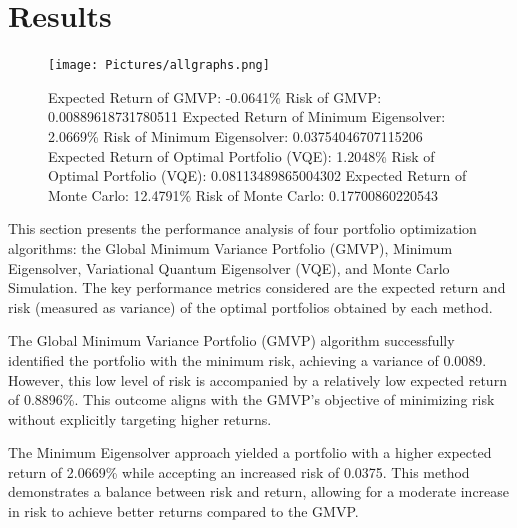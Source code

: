 \documentclass[%
 reprint,
 amsmath,amssymb,
 aps,
]{revtex4-2}
\begin{document}
\section{Results}

\begin{figure}[b]
\texttt{[image: Pictures/allgraphs.png]}
\caption{\label{fig:montecarlo} Expected Return of GMVP: -0.0641\%
Risk of GMVP: 0.00889618731780511 Expected Return of Minimum Eigensolver: 2.0669\% Risk of Minimum Eigensolver: 0.03754046707115206 Expected Return of Optimal Portfolio (VQE): 1.2048\% Risk of Optimal Portfolio (VQE): 0.08113489865004302 Expected Return of Monte Carlo: 12.4791\% Risk of Monte Carlo: 0.17700860220543}
\end{figure}


This section presents the performance analysis of four portfolio optimization algorithms: the Global Minimum Variance Portfolio (GMVP), Minimum Eigensolver, Variational Quantum Eigensolver (VQE), and Monte Carlo Simulation. The key performance metrics considered are the expected return and risk (measured as variance) of the optimal portfolios obtained by each method.

\begin{table}[h]
    \centering
    \caption{Performance Metrics of Portfolio Optimization Algorithms}
    \label{tab:performance_metrics}
\end{table}

The Global Minimum Variance Portfolio (GMVP) algorithm successfully identified the portfolio with the minimum risk, achieving a variance of 0.0089. However, this low level of risk is accompanied by a relatively low expected return of 0.8896\%. This outcome aligns with the GMVP's objective of minimizing risk without explicitly targeting higher returns.

The Minimum Eigensolver approach yielded a portfolio with a higher expected return of 2.0669\% while accepting an increased risk of 0.0375. This method demonstrates a balance between risk and return, allowing for a moderate increase in risk to achieve better returns compared to the GMVP.
\end{document}
